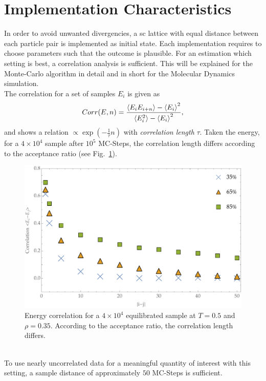 \section{Implementation Characteristics}
In order to avoid unwanted divergencies, a sc lattice with equal distance between each particle pair is implemented as initial state.
Each implementation requires to choose parameters such that the outcome is plausible.
For an estimation which setting is best, a correlation analysis is sufficient.
This will be explained for the Monte-Carlo algorithm in detail and in short for the Molecular Dynamics simulation.\medskip\\
The correlation for a set of samples $E_i$ is given as
\begin{align}
	Corr(E,n) = \frac{\Braket{E_iE_{i+n}}-\Braket{E_i}^2}{\Braket{E_i^2}-\Braket{E_i}^2},
\end{align}
and shows a relation $\propto \exp\left({-\frac{1}{\tau}n}\right)$ with {\em correlation length} $\tau$.
Taken the energy, for a $4\times10^4$ sample after $10^5$ MC-Steps, the correlation length differs according to the acceptance ratio (see Fig.~\ref{fig:MCCorrSeries}).
\begin{figure}[ht]
	\includegraphics[width=\textwidth]{Figures/MCEnergyCorrelations}
	\caption[MC: Energy Correlation Series]{Energy correlation for a $4\times10^4$ equilibrated sample at $T=0.5$ and $\rho=0.35$. According to the acceptance ratio, the correlation length differs.}
	\label{fig:MCCorrSeries}
\end{figure}\\
To use nearly uncorrelated data for a meaningful quantity of interest with this setting, a sample distance of approximately $50$ MC-Steps is sufficient.
